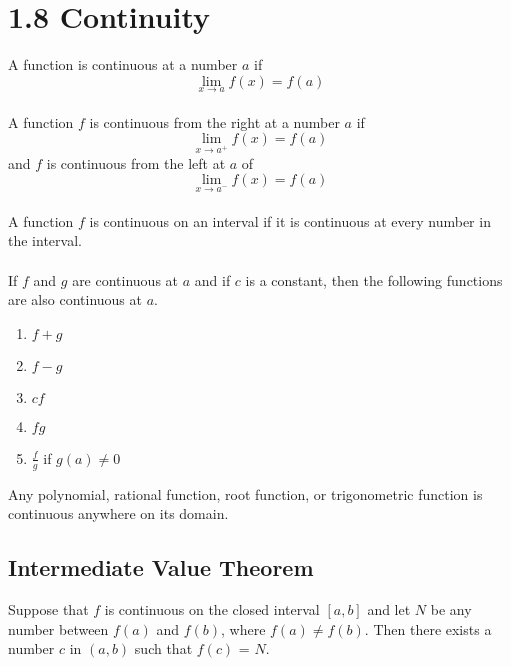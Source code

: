 %
%

\section*{1.8 Continuity}

A function is continuous at a number \(a\) if 
$$\lim_{x \to a}f(x) = f(a)$$\\
A function \(f\) is continuous from the right at a number \(a\) if 
$$\lim_{x \to a^+}f(x)=f(a)$$
and \(f\) is continuous from the left at \(a\) of 
$$\lim_{x \to a^-}f(x)=f(a)$$\\
A function \(f\) is continuous on an interval if it is continuous at every number in the interval.
\\\\
If \(f\) and \(g\) are continuous at \(a\) and if \(c\) is a constant, then the following functions are also continuous at \(a\).
\begin{enumerate}
    \item \(f + g\)
    \item \(f - g\)
    \item \(cf\)
    \item \(fg\)
    \item \(\frac{f}{g}\) if \(g(a) \neq 0\)
\end{enumerate}
Any polynomial, rational function, root function, or trigonometric function is continuous anywhere on its domain.

\subsection*{Intermediate Value Theorem}

Suppose that \(f\) is continuous on the closed interval \([a, b]\) and let \(N\) be any number between \(f(a)\) and \(f(b)\), where \(f(a) \neq f(b)\). Then there exists a number \(c\) in \((a, b)\) such that \(f(c)\) = \(N\).
